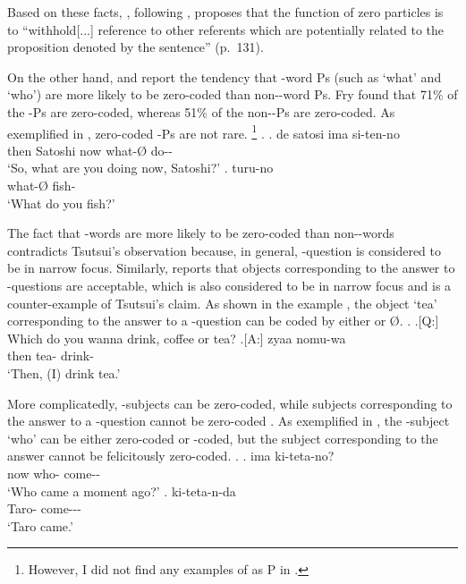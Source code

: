 Based on these facts,
, following ,
proposes that the function of zero particles is to
``withhold[...] reference to other referents 
which are potentially related to the proposition denoted by the sentence'' (p.~131).


On the other hand,
 and  report the tendency that
-word Ps (such as  `what' and  `who') are
more likely to be zero-coded than non--word Ps.
Fry found that 71\% of the -Ps are zero-coded,
whereas 51\% of the non--Ps are zero-coded.
As exemplified in \Next,
zero-coded -Ps are not rare.%
 \footnote{
 However, I did not find any examples of  as P in
 .
 }
%
\ex.
 \ag. de satosi ima  si-ten-no \\
      then Satoshi now what-{\O} do-- \\
      `So, what are you doing now, Satoshi?'
 \bg.  turu-no \\
      what-{\O} fish- \\
      `What do you fish?'

The fact that -words are more likely to be zero-coded than non--words contradicts Tsutsui's observation because,
in general, -question is considered to be in narrow focus.
Similarly,  reports that
objects corresponding to the answer to -questions are acceptable,
which is also considered to be in narrow focus and
is a counter-example of Tsutsui's claim.
As shown in the example \Next[A],
the object  `tea' corresponding to the answer to a -question can be coded by either  or {\O}.
%
\ex.
 \a.[Q:] Which do you wanna drink, coffee or tea?
 \bg.[A:] zyaa  nomu-wa \\
          then tea- drink- \\
          `Then, (I) drink tea.'
          \hfill{\cite[291]{niwa06}}

More complicatedly,
-subjects can be zero-coded,
while subjects corresponding to the answer to a -question cannot be zero-coded \cite{niwa06}.
As exemplified in \Next,
the -subject  `who' can be either zero-coded or -coded,
but the subject corresponding to the answer cannot be felicitously zero-coded.
%
\ex.
 \ag. ima  ki-teta-no? \\
       now who- come-- \\
       `Who came a moment ago?'
 \bg.  ki-teta-n-da \\
       Taro- come--- \\
       `Taro came.'
          \hfill{\cite[291]{niwa06}}

